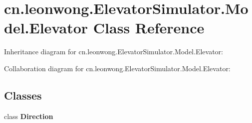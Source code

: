 \hypertarget{classcn_1_1leonwong_1_1_elevator_simulator_1_1_model_1_1_elevator}{}\section{cn.\+leonwong.\+Elevator\+Simulator.\+Model.\+Elevator Class Reference}
\label{classcn_1_1leonwong_1_1_elevator_simulator_1_1_model_1_1_elevator}


Inheritance diagram for cn.\+leonwong.\+Elevator\+Simulator.\+Model.\+Elevator\+:


Collaboration diagram for cn.\+leonwong.\+Elevator\+Simulator.\+Model.\+Elevator\+:
\subsection*{Classes}
\begin{DoxyCompactItemize}
\item 
class {\bfseries Direction}
\end{DoxyCompactItemize}
